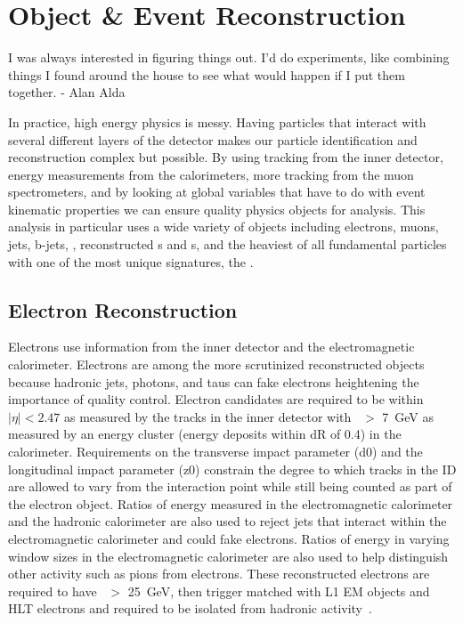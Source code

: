 \chapter{Object \& Event Reconstruction}
\label{SECTION-OBJ}

I was always interested in figuring things out. I'd do experiments, like combining things I found around the house to see what would happen if I put them together. - Alan Alda

\vspace{5mm} %

In practice, high energy physics is messy. Having particles that interact with several different layers of the detector makes our particle identification and reconstruction complex but possible. By using tracking from the inner detector, energy measurements from the calorimeters, more tracking from the muon spectrometers, and by looking at global variables that have to do with event kinematic properties we can ensure quality physics objects for analysis. This analysis in particular uses a wide variety of objects including electrons, muons, jets, b-jets, \met, reconstructed \aw s and \az s, and the heaviest of all fundamental particles with one of the most unique signatures, the \at. 


\section{Electron Reconstruction}
\label{SECTION-OBJ-EL}

Electrons use information from the inner detector and the electromagnetic calorimeter. Electrons are among the more scrutinized reconstructed objects because hadronic jets, photons, and taus can fake electrons heightening the importance of quality control. Electron candidates are required to be within $|\eta | < 2.47$ as measured by the tracks in the inner detector with \PT~$>$ 7~GeV as measured by an energy cluster (energy deposits within dR of 0.4) in the calorimeter. Requirements on the transverse impact parameter (d0) and the longitudinal impact parameter (z0) constrain the degree to which tracks in the ID are allowed to vary from the interaction point while still being counted as part of the electron object. Ratios of energy measured in the electromagnetic calorimeter and the hadronic calorimeter are also used to reject jets that interact within the electromagnetic calorimeter and could fake electrons. Ratios of energy in varying window sizes in the electromagnetic calorimeter are also used to help distinguish other activity such as pions from electrons. These reconstructed electrons are required to have \PT~$>$ 25~GeV, then trigger matched with L1 EM objects and HLT electrons and required to be isolated from hadronic activity~\cite{Electrons,ElEffiRecomm,ELECTRON-RECO}.


